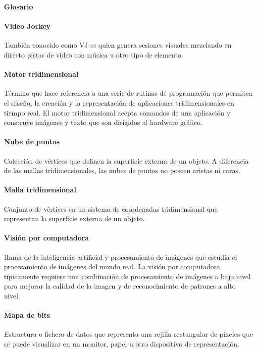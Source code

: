 ﻿\Huge
\textbf{Glosario}

\vspace{10 mm}

\normalsize 

\paragraph{Video Jockey}
También conocido como VJ es quien genera sesiones visuales mezclando en directo pistas de video con música u otro tipo de elemento.

\paragraph{Motor tridimensional}
Término que hace referencia a una serie de rutinas de programación que permiten el diseño, la creación y la representación de aplicaciones tridimensionales en tiempo real.
El motor tridimensional acepta comandos de una aplicación y construye imágenes y texto que son dirigidos al hardware gráfico.
 
\paragraph{Nube de puntos}
Colección de vértices que definen la superficie externa de un objeto.
A diferencia de las mallas tridimensionales, las nubes de puntos no poseen aristas ni caras.

\paragraph{Malla tridimensional}
Conjunto de vértices en un sistema de coordenadas tridimensional que representan la superficie externa de un objeto.

\paragraph{Visión por computadora}
Rama de la inteligencia artificial y procesamiento de imágenes que estudia el procesamiento de imágenes del mundo real. La visión por computadora típicamente requiere una combinación de procesamiento de imágenes a bajo nivel para mejorar la calidad de la imagen y de reconocimiento de patrones a alto nivel.

\paragraph{Mapa de bits}
Estructura o fichero de datos que representa una rejilla rectangular de píxeles que se puede visualizar en un monitor, papel u otro dispositivo de representación.

